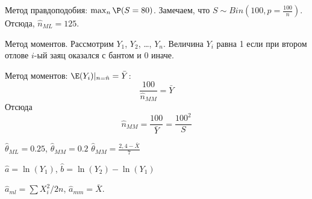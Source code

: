 \begin{solution}{17.2}
Метод правдоподобия: $\max_n \P(S=80)$. Замечаем, что $S \sim Bin\left(100, p=\frac{100}{n}\right)$. Отсюда, $\hat n_{ML} = 125$.

Метод моментов. Рассмотрим $Y_1$, $Y_2$, \ldots, $Y_n$. Величина $Y_i$ равна 1 если при втором отлове $i$-ый заяц оказался с бантом и 0 иначе.

Метод моментов: $\E(Y_i)|_{n=\hat n}=\bar Y$:
\[
\frac{100}{\hat n_{MM}}=\bar Y
\]
Отсюда
\[
\hat n_{MM} = \frac{100}{\bar Y} = \frac{100^2}{S}
\]
\end{solution}
\begin{solution}{17.3}
\end{solution}
\begin{solution}{17.4}
\end{solution}
\begin{solution}{17.5}
\end{solution}
\begin{solution}{18.1}
  $\hat{\theta}_{ML}=0.25$, $\hat{\theta}_{MM}=0.2$
  $\hat{\theta}_{MM}=\frac{2{,}4-\bar{X}}{7}$
\end{solution}
\begin{solution}{18.2}
$\hat{a}=\ln(Y_{1})$, $\hat{b}=\ln(Y_{2})-\ln(Y_{1})$
\end{solution}
\begin{solution}{18.3}
\end{solution}
\begin{solution}{18.4}
\end{solution}
\begin{solution}{18.5}
\end{solution}
\begin{solution}{18.6}
$\hat{a}_{ml}=\sum X_i^2/2n$, $\hat{a}_{mm}=\bar{X}$.
\end{solution}
\begin{solution}{18.7}
\end{solution}
\begin{solution}{18.8}
\end{solution}
\begin{solution}{18.9}
\end{solution}
\begin{solution}{18.10}
\end{solution}
\begin{solution}{18.11}
\end{solution}
\begin{solution}{18.12}
\end{solution}
\begin{solution}{18.13}
\end{solution}
